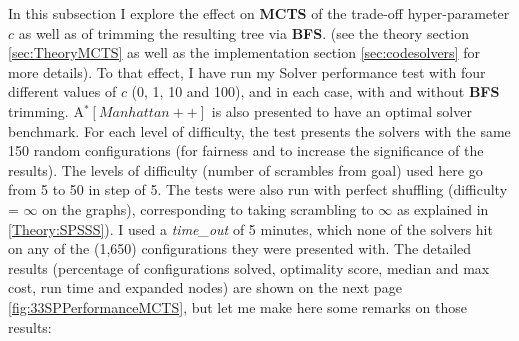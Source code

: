 \label{sec:MTCSHyperParamsEffect}
In this subsection I explore the effect on \textbf{MCTS} of the trade-off hyper-parameter $c$ as well as of trimming the resulting tree via \textbf{BFS}. (see the theory section \ref{sec:TheoryMCTS} as well as the implementation section \ref{sec:codesolvers} for more details). To that effect, I have run my Solver performance test with four different values of $c$ (0, 1, 10 and 100), and in each case, with and without \textbf{BFS} trimming. A$^{*}[Manhattan++]$ is also presented to have an optimal solver benchmark. For each level of difficulty, the test presents the solvers with the same 150 random configurations (for fairness and to increase the significance of the results). The levels of difficulty (number of scrambles from goal) used here go from 5 to 50 in step of 5. The tests were also run with perfect shuffling (difficulty = $\infty$ on the graphs), corresponding to taking scrambling to $\infty$ as explained in \ref{Theory:SPSSS}). I used a \textit{time\_out} of 5 minutes, which none of the solvers hit on any of the (1,650) configurations they were presented with.
The detailed results (percentage of configurations solved, optimality score, median and max cost, run time and expanded nodes) are shown on the next page \ref{fig:33SPPerformanceMCTS}, but let me make here some remarks on those results:
